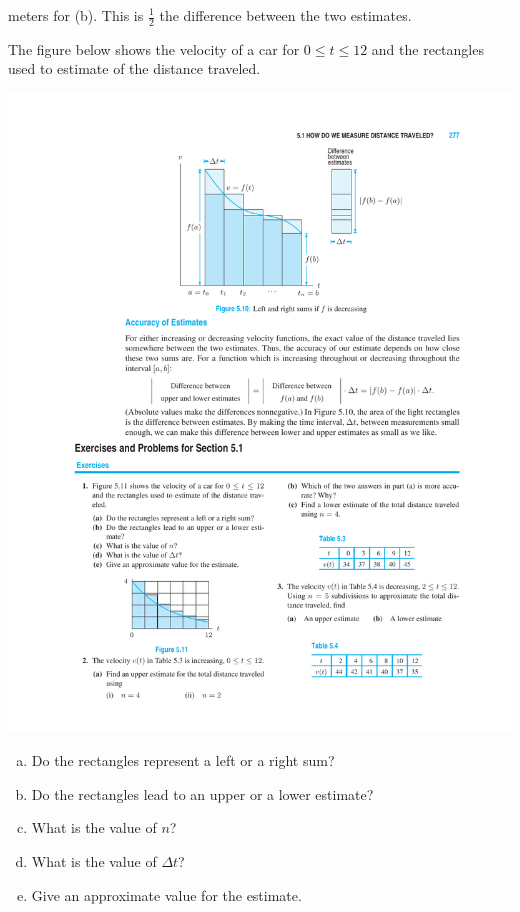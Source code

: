 \documentclass[11pt]{exam}
\begin{document}
\begin{questions}
\begin{solution}
\begin{enumerate}[(a)]
    meters for (b). This is \(\frac{1}{2}\) the difference between the
    two estimates.
  \end{enumerate}
\end{solution}
\question The figure below shows the velocity of a car for $0 \leqslant t \leqslant 12$ and the rectangles used to estimate of the distance traveled.
  \begin{center}
 \includegraphics[scale=1.2]{Figures/fig2.pdf}
  \end{center}
\begin{enumerate}[(a)]
\item Do the rectangles represent a left or a right sum?
\item Do the rectangles lead to an upper or a lower estimate?
\item What is the value of $n$?
\item What is the value of $\Delta t$?
\item Give an approximate value for the estimate.
\end{enumerate}
\begin{solution}

\end{solution}
\end{questions}
\end{document}
